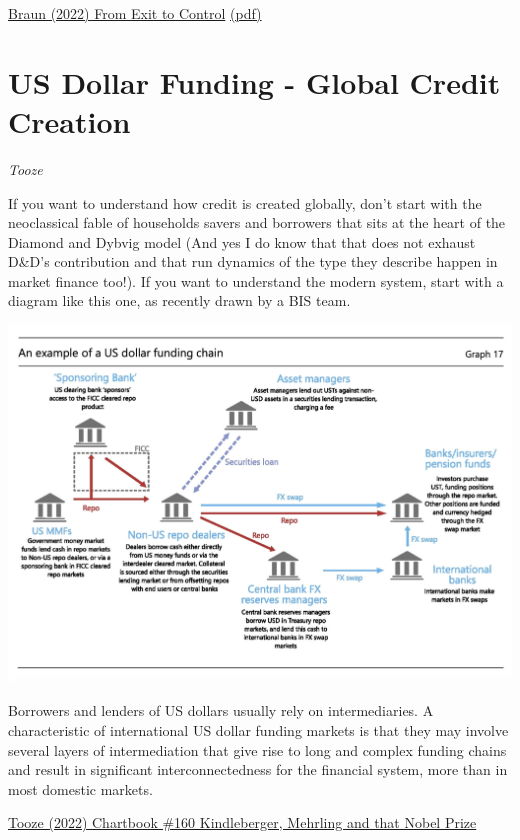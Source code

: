 \documentclass[
]{book}
\begin{document}
\href{https://osf.io/preprints/socarxiv/4uesc}{Braun (2022) From Exit to Control}
\href{pdf/Braun_2022_From_exit_to_control.pdf}{(pdf)}

\hypertarget{us-dollar-funding---global-credit-creation}{%
\section{US Dollar Funding - Global Credit Creation}\label{us-dollar-funding---global-credit-creation}}

\emph{Tooze}

If you want to understand how credit is created globally, don't start with the neoclassical fable of households savers and borrowers that sits at the heart of the Diamond and Dybvig model (And yes I do know that that does not exhaust D\&D's contribution and that run dynamics of the type they describe happen in market finance too!). If you want to understand the modern system, start with a diagram like this one, as recently drawn by a BIS team.

\includegraphics{fig/BIS_global_credit_creation.png}

Borrowers and lenders of US dollars usually rely on intermediaries. A characteristic of international US dollar funding markets is that they may involve several layers of intermediation that give rise to long and complex funding chains and result in significant interconnectedness for the financial system, more than in most domestic markets.

\href{https://adamtooze.substack.com/p/chartbook-160-kindleberger-mehrling}{Tooze (2022) Chartbook \#160 Kindleberger, Mehrling and that Nobel Prize}
\end{document}

